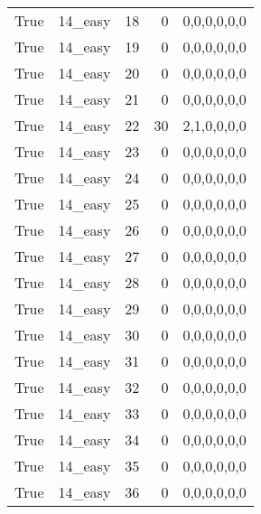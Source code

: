 \begin{tabular}{llrrl}
 True            & 14\_easy             &            18 &                     0 & 0,0,0,0,0,0   \\
 True            & 14\_easy             &            19 &                     0 & 0,0,0,0,0,0   \\
 True            & 14\_easy             &            20 &                     0 & 0,0,0,0,0,0   \\
 True            & 14\_easy             &            21 &                     0 & 0,0,0,0,0,0   \\
 True            & 14\_easy             &            22 &                    30 & 2,1,0,0,0,0   \\
 True            & 14\_easy             &            23 &                     0 & 0,0,0,0,0,0   \\
 True            & 14\_easy             &            24 &                     0 & 0,0,0,0,0,0   \\
 True            & 14\_easy             &            25 &                     0 & 0,0,0,0,0,0   \\
 True            & 14\_easy             &            26 &                     0 & 0,0,0,0,0,0   \\
 True            & 14\_easy             &            27 &                     0 & 0,0,0,0,0,0   \\
 True            & 14\_easy             &            28 &                     0 & 0,0,0,0,0,0   \\
 True            & 14\_easy             &            29 &                     0 & 0,0,0,0,0,0   \\
 True            & 14\_easy             &            30 &                     0 & 0,0,0,0,0,0   \\
 True            & 14\_easy             &            31 &                     0 & 0,0,0,0,0,0   \\
 True            & 14\_easy             &            32 &                     0 & 0,0,0,0,0,0   \\
 True            & 14\_easy             &            33 &                     0 & 0,0,0,0,0,0   \\
 True            & 14\_easy             &            34 &                     0 & 0,0,0,0,0,0   \\
 True            & 14\_easy             &            35 &                     0 & 0,0,0,0,0,0   \\
 True            & 14\_easy             &            36 &                     0 & 0,0,0,0,0,0   \\

\end{tabular}
